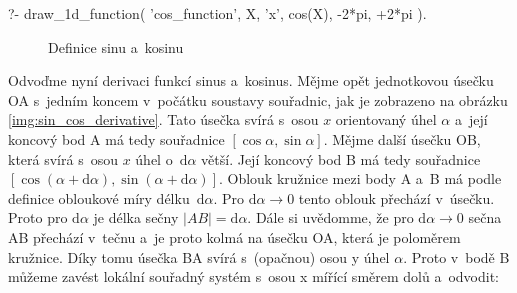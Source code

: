 \begin{prolog}
?-	draw_1d_function(
		'cos_function',
		X,
		'x',
		cos(X),
		-2*pi, +2*pi
	).				
\end{prolog}

\begin{figure}[ht]
\begin{center}
\caption{Definice sinu a~kosinu}
\label{img:sin_cos_def}
\end{center}
\end{figure}


Odvoďme nyní derivaci funkcí sinus a~kosinus. Mějme opět jednotkovou úsečku OA s~jedním koncem v~počátku soustavy souřadnic, jak je zobrazeno na obrázku \eqref{img:sin_cos_derivative}. Tato úsečka svírá s~osou \(x\) orientovaný úhel \(\alpha\) a~její koncový bod A má tedy souřadnice \([\cos \alpha, \sin \alpha]\). Mějme další úsečku OB, která svírá s~osou \(x\) úhel o~\(\mathrm{d}\alpha\) větší. Její koncový bod B má tedy souřadnice \([\cos (\alpha + \mathrm{d}\alpha), \sin (\alpha + \mathrm{d}\alpha)]\). Oblouk kružnice mezi body A a~B má podle definice obloukové míry délku~\(\mathrm{d}\alpha\). Pro \(\mathrm{d}\alpha \to 0\) tento oblouk přechází v~úsečku. Proto pro \(\mathrm{d}\alpha\) je délka sečny \(|AB| = \mathrm{d}\alpha\). Dále si uvědomme, že pro \(\mathrm{d}\alpha \to 0\) sečna AB přechází v~tečnu a~je proto kolmá na úsečku OA, která je poloměrem kružnice. Díky tomu úsečka BA svírá s~(opačnou) osou y úhel \(\alpha\). Proto v~bodě B můžeme zavést lokální souřadný systém s~osou x mířící směrem dolů a~odvodit:

